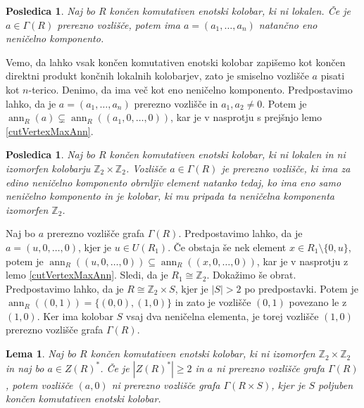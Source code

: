 \documentclass[a4paper, 12pt]{amsart}
\theoremstyle{definition} %
\theoremstyle{plain} %
\newtheorem{lema}[definicija]{Lema}
\newtheorem{posledica}[definicija]{Posledica}
\newcommand{\Z}{\mathbb Z}
\DeclareMathOperator{\ann}{ann}
\begin{document}
\begin{posledica}
\label{cutVertexOneNonzeroComponent}
Naj bo $R$ končen komutativen enotski kolobar, ki ni lokalen. Če je $a\in \Gamma(R)$ prerezno vozlišče, potem ima $a= (a_1,\dots,a_n)$ natančno eno neničelno komponento.
\end{posledica}

\proof
Vemo, da lahko vsak končen komutativen enotski kolobar zapišemo kot končen direktni produkt končnih lokalnih kolobarjev, zato je smiselno vozlišče $a$ pisati kot $n$-terico. Denimo, da ima več kot eno neničelno komponento. Predpostavimo lahko, da je $a=(a_1,\dots,a_n)$ prerezno vozlišče in $a_1,a_2 \neq 0$. Potem je $\ann_R(a) \subsetneq \ann_R((a_1,0,\dots,0))$, kar je v nasprotju s prejšnjo lemo \ref{cutVertexMaxAnn}.
\endproof

\begin{posledica}
\label{cutVertexUnitNonzeroComponent}
Naj bo $R$ končen komutativen enotski kolobar, ki ni lokalen in ni izomorfen kolobarju $\Z_2 \times \Z_2$. Vozlišče $a\in \Gamma(R)$ je prerezno vozlišče, ki ima za edino neničelno komponento obrnljiv element natanko tedaj, ko ima eno samo neničelno komponento in je kolobar, ki mu pripada ta neničelna komponenta izomorfen $\Z_2$.
\end{posledica}

\proof
Naj bo $a$ prerezno vozlišče grafa $\Gamma(R)$. Predpostavimo lahko, da je $a=(u,0,\dots,0)$, kjer je $u\in U(R_1)$. Če obstaja še nek element $x\in R_1 \setminus\{0,u\}$, potem je $\ann_R((u,0,\dots,0)) \subseteq \ann_R((x,0,\dots,0))$, kar je v nasprotju z lemo \ref{cutVertexMaxAnn}. Sledi, da je $R_1\cong \Z_2$.
Dokažimo še obrat. Predpostavimo lahko, da je $R\cong \Z_2 \times S$, kjer je $|S|>2$ po predpostavki. Potem je $\ann_R((0,1)) = \{(0,0),(1,0)\}$ in zato je vozlišče $(0,1)$ povezano le z $(1,0)$. Ker ima kolobar $S$ vsaj dva neničelna elementa, je torej vozlišče $(1,0)$ prerezno vozlišče grafa $\Gamma(R)$. 
\endproof

\begin{lema}
\label{notCutVertexProduct}
Naj bo $R$ končen komutativen enotski kolobar, ki ni izomorfen $\Z_2 \times \Z_2$ in naj bo $a\in Z(R)^*$. Če je $|Z(R)^*| \ge 2$ in $a$ ni prerezno vozlišče grafa $\Gamma(R)$, potem vozlišče $(a,0)$ ni prerezno vozlišče grafa $\Gamma(R\times S)$, kjer je $S$ poljuben končen komutativen enotski kolobar.
\end{lema}
\end{document}
